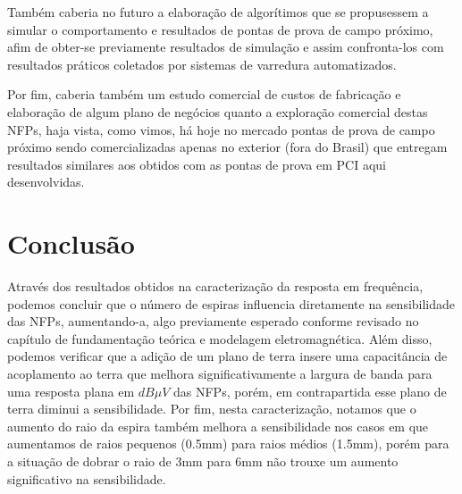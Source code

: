 Também caberia no futuro a elaboração de algorítimos que se propusessem a simular o comportamento e resultados de pontas de prova de campo próximo, afim de obter-se previamente resultados de simulação e assim confronta-los com resultados práticos coletados por sistemas de varredura automatizados.

Por fim, caberia também um estudo comercial de custos de fabricação e elaboração de algum plano de negócios quanto a exploração comercial destas NFPs, haja vista, como vimos, há hoje no mercado pontas de prova de campo próximo sendo comercializadas apenas no exterior (fora do Brasil) que entregam resultados similares aos obtidos com as pontas de prova em PCI aqui desenvolvidas.
	
\section{Conclusão}



Através dos resultados obtidos na caracterização da resposta em frequência, podemos concluir que o número de espiras influencia diretamente na sensibilidade das NFPs, aumentando-a, algo previamente esperado conforme revisado no capítulo de fundamentação teórica e modelagem eletromagnética. Além disso, podemos verificar que a adição de um plano de terra insere uma capacitância de acoplamento ao terra que melhora significativamente a largura de banda para uma resposta plana em $dB \mu V$ das NFPs, porém, em contrapartida esse plano de terra diminui a sensibilidade. Por fim, nesta caracterização, notamos que o aumento do raio da espira também melhora a sensibilidade nos casos em que aumentamos de raios pequenos (0.5mm) para raios médios (1.5mm), porém para a situação de dobrar o raio de 3mm para 6mm não trouxe um aumento significativo na sensibilidade.

